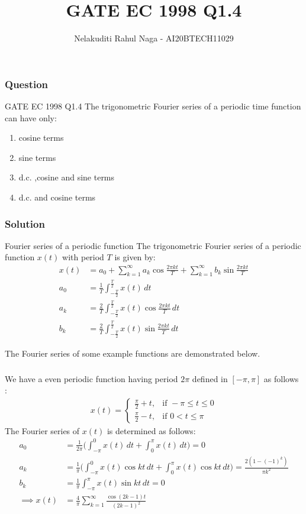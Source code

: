\documentclass{beamer}
\title{GATE EC 1998 Q1.4}
\author{Nelakuditi Rahul Naga - AI20BTECH11029}
\begin{document}
\begin{frame}
\titlepage
\end{frame}

\begin{frame}
\frametitle{Question}
\begin{block}{GATE EC 1998 Q1.4}
The trigonometric Fourier series of a periodic time function can have only:
\begin{enumerate}
\item cosine terms 
\item sine terms
\item d.c. ,cosine and sine terms
\item d.c. and cosine terms 
\end{enumerate}
\end{block}
\end{frame}

\begin{frame}
\frametitle{Solution}
\begin{block}{Fourier series of a periodic function}
The trigonometric Fourier series of a periodic function $x(t)$ with period $T$ is given by:
\begin{align}
x(t) &= a_{0} + \sum_{k=1}^{\infty}a_{k}\cos{\frac{2\pi kt}{T}} +\sum_{k=1}^{\infty}b_{k}\sin{\frac{2\pi kt}{T}} \\
a_{0} &= \frac{1}{T}{\int_{-\frac{T}{2}}^{\frac{T}{2}}x(t)\, dt} \\
a_{k} &= \frac{2}{T}{\int_{-\frac{T}{2}}^{\frac{T}{2}}x(t)\cos{\frac{2\pi kt}{T}}\, dt} \\
b_{k} &= \frac{2}{T}{\int_{-\frac{T}{2}}^{\frac{T}{2}}x(t)\sin{\frac{2\pi kt}{T}}\, dt} 
\end{align}
\end{block}
The Fourier series of some example functions are demonstrated below.
\end{frame}

\begin{frame}
\frametitle{}
We have a even periodic function having period $2\pi$ defined in $[-\pi,\pi]$ as follows :
\begin{align}
x(t)=  
\begin{cases}
\frac{\pi}{2}+t, & \text{if } -\pi \leq t \leq 0\\
\frac{\pi}{2}-t, & \text{if } 0 < t \leq \pi \nonumber
\end{cases}
\end{align}
The Fourier series of $x(t)$ is determined as follows:
\begin{align}
a_{0} &=\frac{1}{2\pi}\Bigg({\int_{-\pi}^{0}x(t)\, dt}+{\int_{0}^{\pi}x(t)\, dt}\Bigg)=0 \nonumber \\
a_{k} &= \frac{1}{\pi}\Bigg({\int_{-\pi}^{0}x(t)\cos{kt}\, dt}+{\int_{0}^{\pi}x(t)\cos{kt}\, dt}\Bigg) \nonumber = \frac{2(1-(-1)^{k})}{\pi k^{2}}\nonumber \\
b_{k} &= \frac{1}{\pi}{\int_{-\pi}^{\pi}x(t)\sin{kt}\, dt} = 0 \nonumber \\
\implies x(t) &= \frac{4}{\pi}\sum_{k=1}^{\infty}\frac{\cos{(2k-1)t}}{(2k-1)^{2}}
\end{align}
\end{frame}
\end{document}
